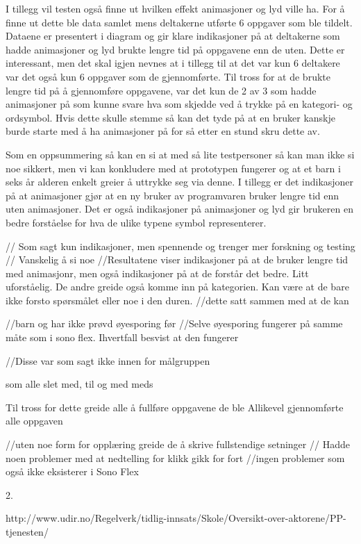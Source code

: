 I tillegg vil testen også finne ut hvilken effekt animasjoner og lyd ville ha. For å finne ut dette ble data samlet mens deltakerne utførte 6 oppgaver som ble tildelt. Dataene er presentert i diagram og gir klare indikasjoner på at deltakerne som hadde animasjoner og lyd brukte lengre tid på oppgavene enn de uten. Dette er interessant, men det skal igjen nevnes at i tillegg til at det var kun 6 deltakere var det også kun 6 oppgaver som de gjennomførte. Til tross for at de brukte lengre tid på å gjennomføre oppgavene, var det kun de 2 av 3 som hadde animasjoner på som kunne svare hva som skjedde ved å trykke på en kategori- og ordsymbol. Hvis dette skulle stemme så kan det tyde på at en bruker kanskje burde starte med å ha animasjoner på for så etter en stund skru dette av.  
 
 
Som en oppsummering så kan en si at med så lite testpersoner så kan man ikke si noe sikkert, men vi kan konkludere med at prototypen fungerer og at et barn i seks år alderen enkelt greier å uttrykke seg via denne. I tillegg er det indikasjoner på at animasjoner gjør at en ny bruker av programvaren bruker lengre tid enn uten animasjoner. Det er også indikasjoner på animasjoner og lyd gir brukeren en bedre forståelse for hva de ulike typene symbol representerer.  
 
 
 
 
 
 
// Som sagt kun indikasjoner, men spennende og trenger mer forskning og testing 
// Vanskelig å si noe 
//Resultatene viser indikasjoner på at de bruker lengre tid med animasjonr, men også indikasjoner på at de forstår det bedre. Litt uforståelig. De andre greide også komme inn på kategorien. Kan være at de bare ikke forsto spørsmålet eller noe i den duren. 
//dette satt sammen med at de kan 
 
 
 
 
//barn og har ikke prøvd øyesporing før 
//Selve øyesporing fungerer på samme måte som i sono flex. Ihvertfall besvist at den fungerer 
 
 
 
 
 
 
//Disse var som sagt ikke innen for målgruppen 
 
 
som alle slet med, til og med meds 
 
 
 
 
Til tross for dette greide alle å fullføre oppgavene de ble Allikevel gjennomførte alle oppgaven 
 
 
 
 
 
 
 
 
 
 
//uten noe form for opplæring greide de å skrive fullstendige setninger 
// Hadde noen problemer med at nedtelling for klikk gikk for fort 
//ingen problemer som også ikke eksisterer i Sono Flex 
 
 
 
 
2. 
 
 
 
 
 
 
 
 
 
 
 
 
http://www.udir.no/Regelverk/tidlig-innsats/Skole/Oversikt-over-aktorene/PP-tjenesten/  
 